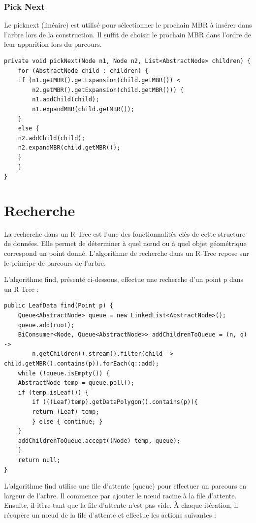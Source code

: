 \documentclass {article}
\begin{document}
\subsubsection {Pick Next}

Le picknext (linéaire) est utilisé pour sélectionner le prochain MBR à insérer dans l'arbre lors de la construction.
Il suffit de choisir le prochain MBR dans l'ordre de leur apparition lors du parcours.


\begin{verbatim}
private void pickNext(Node n1, Node n2, List<AbstractNode> children) {
    for (AbstractNode child : children) {
	if (n1.getMBR().getExpansion(child.getMBR()) <
		n2.getMBR().getExpansion(child.getMBR())) {
	    n1.addChild(child);
	    n1.expandMBR(child.getMBR());
	}
	else {
	n2.addChild(child);
	n2.expandMBR(child.getMBR());
	}
    }
}
\end{verbatim}

\section {Recherche}\label{recherche}



La recherche dans un R-Tree est l'une des fonctionnalités clés de cette structure de données.
Elle permet de déterminer à quel nœud ou à quel objet géométrique correspond un point donné.
L'algorithme de recherche dans un R-Tree repose sur le principe de parcours de l'arbre.

L'algorithme find, présenté ci-dessous, effectue une recherche d'un point p dans un R-Tree :


\begin{verbatim}
public LeafData find(Point p) {
    Queue<AbstractNode> queue = new LinkedList<AbstractNode>();
    queue.add(root);
    BiConsumer<Node, Queue<AbstractNode>> addChildrenToQueue = (n, q) ->
        n.getChildren().stream().filter(child -> child.getMBR().contains(p)).forEach(q::add);
    while (!queue.isEmpty()) {
	AbstractNode temp = queue.poll();
	if (temp.isLeaf()) {
	    if (((Leaf)temp).getDataPolygon().contains(p)){
		return (Leaf) temp;
	    } else { continue; }
	}
	addChildrenToQueue.accept((Node) temp, queue);
    }
    return null;
}
\end{verbatim}

L'algorithme find utilise une file d'attente (queue) pour effectuer un parcours en largeur de l'arbre.
Il commence par ajouter le nœud racine à la file d'attente. Ensuite, il itère tant que la file d'attente
n'est pas vide. À chaque itération, il récupère un nœud de la file d'attente et effectue les actions suivantes :
\end{document}
